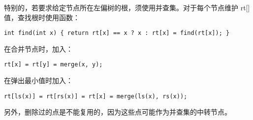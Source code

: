 \inputminted{cpp}{src/data structure/heap.cpp}
特别的，若要求给定节点所在左偏树的根，须使用并查集。对于每个节点维护 rt[] 值，查找根时使用函数：
\begin{verbatim}
int find(int x) { return rt[x] == x ? x : rt[x] = find(rt[x]); }
\end{verbatim}
在合并节点时，加入：
\begin{verbatim}
rt[x] = rt[y] = merge(x, y);
\end{verbatim}
在弹出最小值时加入：
\begin{verbatim}
rt[ls(x)] = rt[rs(x)] = rt[x] = merge(ls(x), rs(x));
\end{verbatim}
另外，删除过的点是不能复用的，因为这些点可能作为并查集的中转节点。
